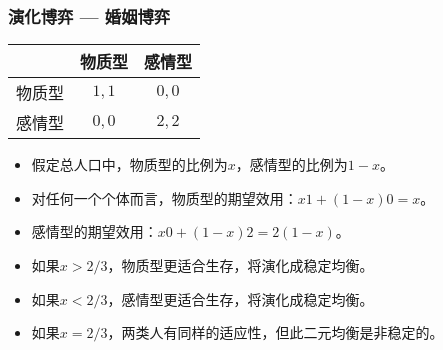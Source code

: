 \documentclass[UTF8,11pt,colorlinks,compress,openany]{beamer}%
\begin{document}
\begin{frame}\frametitle{演化博弈 --- 婚姻博弈}
\begin{table}
\begin{tabu}{c|c|c}
\hline
& 物质型 & 感情型 \\
\hline
物质型 & $1,1$ & $0,0$ \\
感情型 & $0,0$ & $2,2$ \\
\hline
\end{tabu}
\end{table}
\begin{itemize}
	\item 假定总人口中，物质型的比例为$x$，感情型的比例为$1-x$。
	\item 对任何一个个体而言，物质型的期望效用：$x1+(1-x)0=x$。
	\item 感情型的期望效用：$x0+(1-x)2=2(1-x)$。
	\item 如果$x>2/3$，物质型更适合生存，将演化成稳定均衡。
	\item 如果$x<2/3$，感情型更适合生存，将演化成稳定均衡。
	\item 如果$x=2/3$，两类人有同样的适应性，但此二元均衡是非稳定的。
\end{itemize}
\end{frame}
\end{document}
